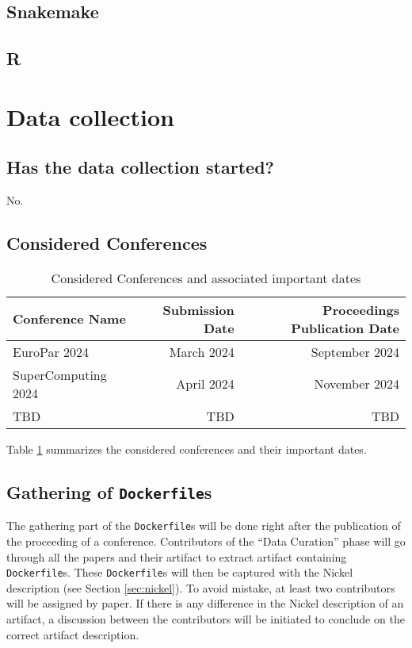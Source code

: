 \documentclass{article}
\newcommand{\noteqg}{\todo[backgroundcolor=blue!10,bordercolor=blue,inline,caption={}]}
\newcommand{\dfile}{\texttt{Dockerfile}}
\begin{document}
\subsection{Snakemake}

\subsection{R}

\section{Data collection}

\subsection{Has the data collection started?}

No.

\subsection{Considered Conferences}

\begin{table}
  \centering
  \begin{tabular}{lrr}
    \toprule
    Conference Name     & Submission Date & Proceedings Publication Date\\
    \midrule
    EuroPar 2024        & March 2024      & September 2024\\
    SuperComputing 2024 & April 2024      & November 2024 \\
    TBD                 & TBD             & TBD           \\
    \bottomrule
\end{tabular}
  \caption{Considered Conferences and associated important dates}
  \label{tab:conferences}
\end{table}

Table \ref{tab:conferences} summarizes the considered conferences and their important dates.

\noteqg{todo}

\subsection{Gathering of \dfile s}

The gathering part of the \dfile s will be done right after the publication of the proceeding of a conference.
Contributors of the ``Data Curation'' phase will go through all the papers and their artifact to extract artifact containing \dfile s.
These \dfile s will then be captured with the Nickel description (see Section \ref{sec:nickel}).
To avoid mistake, at least two contributors will be assigned by paper.
If there is any difference in the Nickel description of an artifact, a discussion between the contributors will be initiated to conclude on the correct artifact description.
\end{document}
